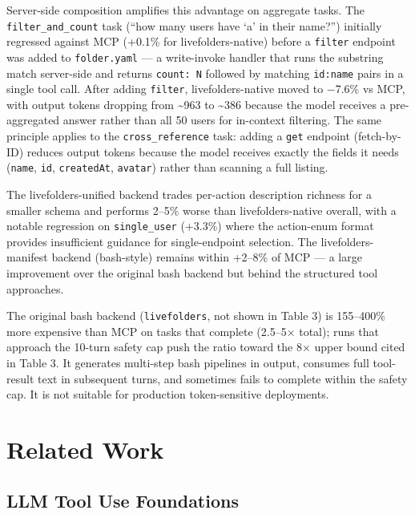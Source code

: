 \documentclass[
  11pt,
]{article}
\begin{document}
Server-side composition amplifies this advantage on aggregate tasks. The
\texttt{filter\_and\_count} task (``how many users have `a' in their
name?'') initially regressed against MCP (+0.1\% for livefolders-native)
before a \texttt{filter} endpoint was added to \texttt{folder.yaml} ---
a write-invoke handler that runs the substring match server-side and
returns \texttt{count:\ N} followed by matching \texttt{id:name} pairs
in a single tool call. After adding \texttt{filter}, livefolders-native
moved to −7.6\% vs MCP, with output tokens dropping from
\textasciitilde963 to \textasciitilde386 because the model receives a
pre-aggregated answer rather than all 50 users for in-context filtering.
The same principle applies to the \texttt{cross\_reference} task: adding
a \texttt{get} endpoint (fetch-by-ID) reduces output tokens because the
model receives exactly the fields it needs (\texttt{name}, \texttt{id},
\texttt{createdAt}, \texttt{avatar}) rather than scanning a full
listing.

The livefolders-unified backend trades per-action description richness
for a smaller schema and performs 2--5\% worse than livefolders-native
overall, with a notable regression on \texttt{single\_user} (+3.3\%)
where the action-enum format provides insufficient guidance for
single-endpoint selection. The livefolders-manifest backend (bash-style)
remains within +2--8\% of MCP --- a large improvement over the original
bash backend but behind the structured tool approaches.

The original bash backend (\texttt{livefolders}, not shown in Table 3)
is 155--400\% more expensive than MCP on tasks that complete (2.5--5×
total); runs that approach the 10-turn safety cap push the ratio toward
the 8× upper bound cited in Table 3. It generates multi-step bash
pipelines in output, consumes full tool-result text in subsequent turns,
and sometimes fails to complete within the safety cap. It is not
suitable for production token-sensitive deployments.

\hypertarget{related-work}{%
\section{Related Work}\label{related-work}}

\hypertarget{llm-tool-use-foundations}{%
\subsection{LLM Tool Use Foundations}\label{llm-tool-use-foundations}}
\end{document}
